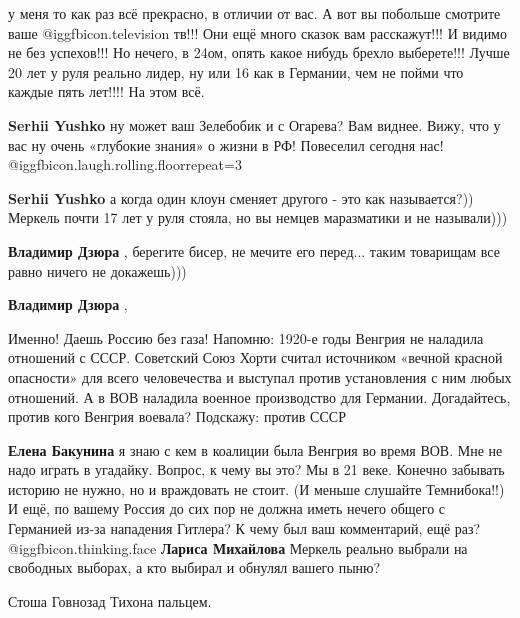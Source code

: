 \begin{itemize}
\begin{itemize}
у меня то как раз всё прекрасно, в отличии от вас. А вот вы побольше смотрите
ваше  @igg{fbicon.television}  тв!!! Они ещё много сказок вам расскажут!!! И видимо не без успехов!!!
Но нечего, в 24ом, опять какое нибудь брехло выберете!!! Лучше 20 лет у руля
реально лидер, ну или 16 как в Германии, чем не пойми что каждые пять лет!!!!
На этом всё.

\textbf{Serhii Yushko} ну может ваш Зелебобик и с Огарева? Вам виднее. Вижу, что у вас ну очень «глубокие знания» о жизни в РФ! Повеселил сегодня нас! @igg{fbicon.laugh.rolling.floor}{repeat=3} 

\textbf{Serhii Yushko} а когда один клоун сменяет другого - это как называется?)) Меркель почти 17 лет у руля стояла, но вы немцев маразматики и не называли)))

\textbf{Владимир Дзюра} , берегите бисер, не мечите его перед... таким товарищам все равно ничего не докажешь)))

\textbf{Владимир Дзюра} , 

Именно! Даешь Россию без газа! Напомню: 1920-е годы Венгрия не наладила
отношений с СССР. Советский Союз Хорти считал источником «вечной красной
опасности» для всего человечества и выступал против установления с ним любых
отношений. А в ВОВ наладила военное производство для Германии. Догадайтесь,
против кого Венгрия воевала? Подскажу: против СССР

\textbf{Елена Бакунина} я знаю с кем в коалиции была Венгрия во время ВОВ. Мне не надо играть в угадайку. Вопрос, к чему вы это? Мы в 21 веке. Конечно забывать историю не нужно, но и враждовать не стоит. (И меньше слушайте Темнибока!!) И ещё, по вашему Россия до сих пор не должна иметь нечего общего с Германией из-за нападения Гитлера? К чему был ваш комментарий, ещё раз?  @igg{fbicon.thinking.face} 
\textbf{Лариса Михайлова} Меркель реально выбрали на свободных выборах, а кто выбирал и обнулял вашего пыню?

\end{itemize} %

Стоша Говнозад Тихона пальцем.

\end{itemize} %
